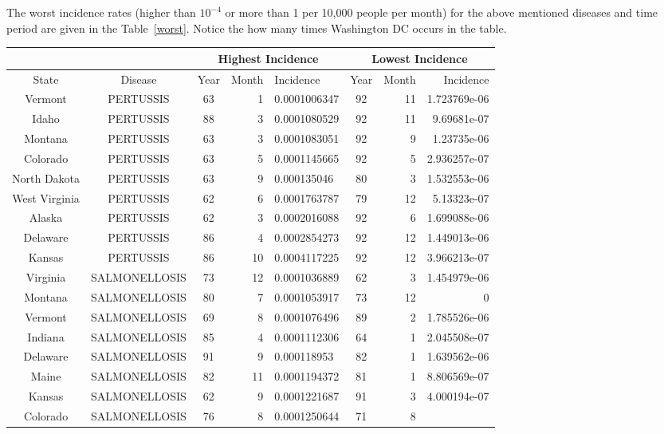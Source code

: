 The worst incidence rates (higher than $10^{-4}$ or more than 1 per
10,000 people per month) for the above mentioned diseases and time
period are given in the Table~\ref{worst}. Notice the how many times
Washington DC occurs in the table.

{\footnotesize
\begin{table}
  \begin{tabular}{|c|c|c|r|l|c|r|r|}
    \multicolumn{2}{c}{}& \multicolumn{3}{c}{Highest Incidence} &
    \multicolumn{3}{c}{Lowest Incidence} \\ \hline State & Disease &
    Year & Month & Incidence & Year & Month & Incidence \\ \hline
    Vermont & PERTUSSIS & 63 & 1 & 0.0001006347 & 92 & 11 &
    1.723769e-06\\ Idaho & PERTUSSIS & 88 & 3 & 0.0001080529 & 92 &
    11 & 9.69681e-07 \\ Montana & PERTUSSIS & 63 & 3 & 0.0001083051
    & 92 & 9 & 1.23735e-06 \\ Colorado & PERTUSSIS & 63 & 5 &
    0.0001145665 & 92 & 5 & 2.936257e-07\\ North Dakota & PERTUSSIS
    & 63 & 9 & 0.000135046 & 80 & 3 & 1.532553e-06\\ West Virginia &
    PERTUSSIS & 62 & 6 & 0.0001763787 & 79 & 12 & 5.13323e-07 \\ 
    Alaska & PERTUSSIS & 62 & 3 & 0.0002016088 & 92 & 6 &
    1.699088e-06\\ Delaware & PERTUSSIS & 86 & 4 & 0.0002854273 & 92
    & 12 & 1.449013e-06\\ Kansas & PERTUSSIS & 86 & 10 &
    0.0004117225 & 92 & 12 & 3.966213e-07\\\hline Virginia &
    SALMONELLOSIS & 73 & 12 & 0.0001036889 & 62 & 3 & 1.454979e-06\\ 
    Montana & SALMONELLOSIS & 80 & 7 & 0.0001053917 & 73 & 12 & 0 \\ 
    Vermont & SALMONELLOSIS & 69 & 8 & 0.0001076496 & 89 & 2 &
    1.785526e-06\\ Indiana & SALMONELLOSIS & 85 & 4 & 0.0001112306 &
    64 & 1 & 2.045508e-07\\ Delaware & SALMONELLOSIS & 91 & 9 &
    0.000118953 & 82 & 1 & 1.639562e-06\\ Maine & SALMONELLOSIS & 82
    & 11 & 0.0001194372 & 81 & 1 & 8.806569e-07\\ Kansas &
    SALMONELLOSIS & 62 & 9 & 0.0001221687 & 91 & 3 & 4.000194e-07\\ 
    Colorado & SALMONELLOSIS & 76 & 8 & 0.0001250644 & 71 & 8 &

\end{tabular}
\end{table}}
